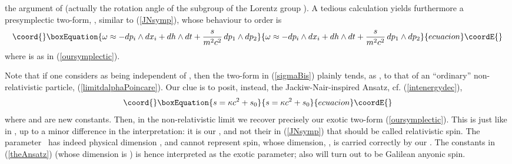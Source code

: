 \documentclass[a4paper,11pt]{article}
\def\vu{{\vec u}}
\begin{document}
the argument of \myHighlight{$\vu$}\coordHE{} (actually
   the rotation angle of the \coordHE{} subgroup of the Lorentz
group \coordHE{}).
A tedious calculation yields furthermore a presymplectic two-form,
\coordHE{}, similar to (\ref{JNsymp}),
whose behaviour to order \coordHE{} is
\begin{equation}\coord{}\boxEquation{
\omega
\approx
-dp_i\wedge{}dx_i
+
dh\wedge{}dt
+
\frac{s}{m^2c^2}\,dp_1\wedge{}dp_2
\label{sigmaBis}
}{
\omega
\approx
-dp_i\wedge{}dx_i
+
dh\wedge{}dt
+
\frac{s}{m^2c^2}\,dp_1\wedge{}dp_2
}{ecuacion}\coordE{}\end{equation}
where \coordHE{} is as in (\ref{oursymplectic}).


Note that if one
considers \coordHE{} as being independent of \coordHE{}, then the two-form
\myHighlight{$\omega$}\coordHE{} in (\ref{sigmaBis}) plainly tends, as \coordHE{}, to that
of an ``ordinary'' non-relativistic particle, (\ref{limitdalphaPoincare}).
Our clue is to posit, instead, the Jackiw-Nair-inspired Ansatz, cf.
(\ref{intenergydec}),
\begin{equation}\coord{}\boxEquation{
s=
\kappa{}c^2+s_0
\label{theAnsatz}
}{
s=
\kappa{}c^2+s_0
}{ecuacion}\coordE{}\end{equation}
where  \myHighlight{$\kappa$}\coordHE{} and \coordHE{} are new constants.
 Then, in the non-relativistic limit  we recover precisely our exotic two-form
(\ref{oursymplectic}). This is just like in
\cite{JaNa2}, up to a minor difference in the interpretation: it is our
\coordHE{}, and
not their \coordHE{} in (\ref{JNsymp})
that should be called relativistic spin.
The parameter~\coordHE{}  has indeed physical dimension
\myHighlight{$[S]=[\hbar/c^2]$}\coordHE{},
and cannot represent spin, whose dimension, \myHighlight{$[\hbar]$}\coordHE{}, is carried
correctly by our \coordHE{}. The constants \myHighlight{$\kappa$}\coordHE{} in (\ref{theAnsatz})
(whose dimension is \myHighlight{$[\hbar/c^2]$}\coordHE{})
is hence interpreted as the exotic parameter; also
\coordHE{} will turn out to be Galilean anyonic spin.
\end{document}
